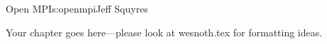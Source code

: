 \begin{aosachapter}{Open MPI}{s:openmpi}{Jeff Squyres}

Your chapter goes here---please look at wesnoth.tex for formatting ideas.

\end{aosachapter}
